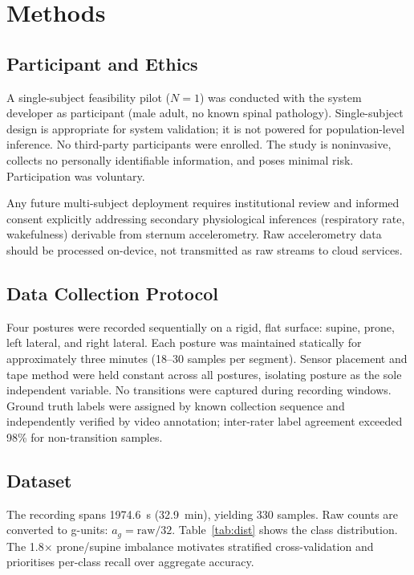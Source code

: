 \documentclass[journal]{IEEEtran}
\begin{document}
\section{Methods}

\subsection{Participant and Ethics}
A single-subject feasibility pilot ($N=1$) was conducted with the system
developer as participant (male adult, no known spinal pathology).
Single-subject design is appropriate for system validation; it is not
powered for population-level inference. No third-party
participants were enrolled. The study is noninvasive, collects no personally
identifiable information, and poses minimal risk. Participation was
voluntary.

Any future multi-subject deployment requires institutional review and
informed consent explicitly addressing secondary physiological inferences
(respiratory rate, wakefulness) derivable from sternum accelerometry. Raw accelerometry data should be processed
on-device, not transmitted as raw streams to cloud services.

\subsection{Data Collection Protocol}
Four postures were recorded sequentially on a rigid, flat surface: supine,
prone, left lateral, and right lateral. Each posture was maintained
statically for approximately three minutes (18--30 samples per segment).
Sensor placement and tape method were held constant across all postures,
isolating posture as the sole independent variable. No transitions were
captured during recording windows. Ground truth labels were assigned by
known collection sequence and independently verified by video annotation;
inter-rater label agreement exceeded 98\% for non-transition samples.

\subsection{Dataset}
The recording spans 1974.6~s (32.9~min), yielding 330 samples.
Raw counts are converted to g-units: $a_g = \text{raw}/32$.
Table~\ref{tab:dist} shows the class distribution. The 1.8$\times$
prone/supine imbalance motivates stratified cross-validation and prioritises
per-class recall over aggregate accuracy.
\end{document}
